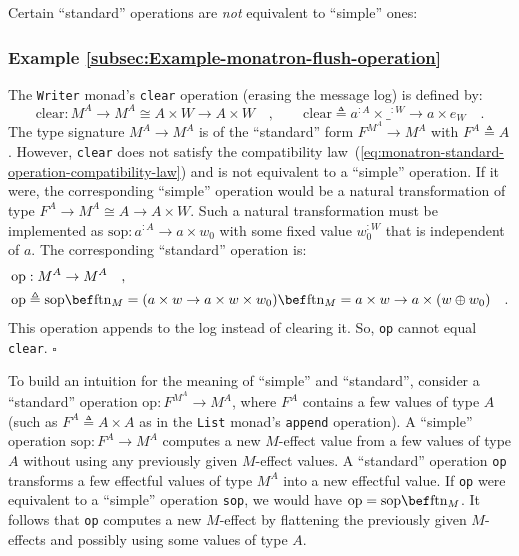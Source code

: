 Certain \textsf{``}standard\textsf{''} operations are \emph{not} equivalent to \textsf{``}simple\textsf{''}
ones:

\subsubsection{Example \label{subsec:Example-monatron-flush-operation}\ref{subsec:Example-monatron-flush-operation}}

The \lstinline!Writer! monad\textsf{'}s \lstinline!clear! operation (erasing
the message log) is defined by:
\[
\text{clear}:M^{A}\rightarrow M^{A}\cong A\times W\rightarrow A\times W\quad,\quad\quad\text{clear}\triangleq a^{:A}\times\_^{:W}\rightarrow a\times e_{W}\quad.
\]
The type signature $M^{A}\rightarrow M^{A}$ is of the \textsf{``}standard\textsf{''}
form $F^{M^{A}}\rightarrow M^{A}$ with $F^{A}\triangleq A$. However,
\lstinline!clear! does not satisfy the compatibility law~(\ref{eq:monatron-standard-operation-compatibility-law})
and is not equivalent to a \textsf{``}simple\textsf{''} operation. If it were, the
corresponding \textsf{``}simple\textsf{''} operation would be a natural transformation
of type $F^{A}\rightarrow M^{A}\cong A\rightarrow A\times W$. Such
a natural transformation must be implemented as $\text{sop}:a^{:A}\rightarrow a\times w_{0}$
with some fixed value $w_{0}^{:W}$ that is independent of $a$. The
corresponding \textsf{``}standard\textsf{''} operation is:
\begin{align*}
 & \text{op}:M^{A}\rightarrow M^{A}\quad,\\
 & \text{op}\triangleq\text{sop}\bef\text{ftn}_{M}=(a\times w\rightarrow a\times w\times w_{0})\bef\text{ftn}_{M}=a\times w\rightarrow a\times(w\oplus w_{0})\quad.
\end{align*}
This operation appends to the log instead of clearing it. So, \lstinline!op!
cannot equal \lstinline!clear!. $\square$

To build an intuition for the meaning of \textsf{``}simple\textsf{''} and \textsf{``}standard\textsf{''},
consider a \textsf{``}standard\textsf{''} operation $\text{op}:F^{M^{A}}\rightarrow M^{A}$,
where $F^{A}$ contains a few values of type $A$ (such as $F^{A}\triangleq A\times A$
as in the \lstinline!List! monad\textsf{'}s \lstinline!append! operation).
A \textsf{``}simple\textsf{''} operation $\text{sop}:F^{A}\rightarrow M^{A}$ computes
a new $M$-effect value from a few values of type $A$ without using
any previously given $M$-effect values. A \textsf{``}standard\textsf{''} operation
\lstinline!op! transforms a few effectful values of type $M^{A}$
into a new effectful value. If \lstinline!op! were equivalent to
a \textsf{``}simple\textsf{''} operation \lstinline!sop!, we would have $\text{op}=\text{sop}\bef\text{ftn}_{M}$.
It follows that \lstinline!op! computes a new $M$-effect by flattening
the previously given $M$-effects and possibly using some values of
type $A$. 

